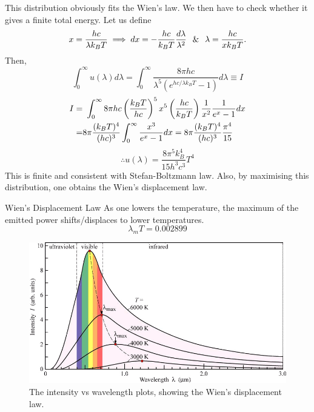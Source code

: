 This distribution obviously fits the Wien's law. We then have to check whether it gives a finite total energy. Let us define 
\begin{equation}
    x = \frac{hc}{\lambda k_BT} \implies dx = -\frac{hc}{k_BT}\frac{d\lambda}{\lambda^2} \hspace{0.25cm}\&\hspace{0.25cm} \lambda = \frac{hc}{xk_BT}.
\end{equation}
Then,
\begin{equation}
    \int_{0}^{\infty}u(\lambda)d\lambda = \int_{0}^{\infty}\frac{8\pi hc}{\lambda^5(e^{hc/\lambda k_BT}-1)}d\lambda \equiv I
\end{equation}
\begin{align}
    I =& \int_{0}^{\infty}8\pi hc\lrp{\frac{k_BT}{hc}}^5x^5\lrp{\frac{hc}{k_BT}}\frac{1}{x^2}\frac{1}{e^x-1}dx\notag\\
    =& 8\pi\frac{(k_BT)^4}{(hc)^3}\int_{0}^{\infty}\frac{x^3}{e^x-1}dx =  8\pi\frac{(k_BT)^4}{(hc)^3}\frac{\pi^4}{15}\notag
\end{align}
\begin{equation}
    \therefore u(\lambda) = \frac{8\pi^5k_B^4}{15h^3c^3}T^4
\end{equation}
This is finite and consistent with Stefan-Boltzmann law. Also, by maximising this distribution, one obtains the Wien's displacement law.
\begin{law*}{Wien's Displacement Law}
    As one lowers the temperature, the maximum of the emitted power shifts/displaces to lower temperatures.
    \begin{equation}
        \lambda_mT = 0.002899
    \end{equation}
\end{law*}
\begin{figure}[h!]
    \centering
    \includegraphics[width=0.5\linewidth]{wiendisplacement.png}
    \caption{The intensity vs wavelength plots, showing the Wien's displacement law.}
    \label{fig:wiendisplacement}
 \end{figure}

